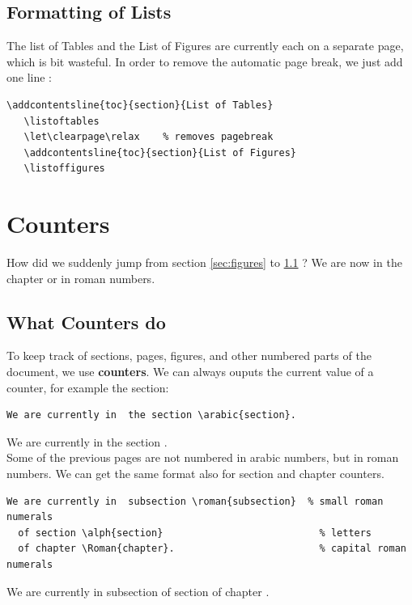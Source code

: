 \documentclass[a4paper,10pt]{report} %
\begin{document}
\subsection{Formatting of Lists}

The list of Tables and the List of Figures are currently each on a separate page, which is bit wasteful. In order to remove the automatic page break, we just add one line : 
\begin{lstlisting}[language={[latex]tex}, frame=single,basicstyle=\footnotesize]
   \addcontentsline{toc}{section}{List of Tables}
   \listoftables  
   \let\clearpage\relax    % removes pagebreak                       
   \addcontentsline{toc}{section}{List of Figures}  
   \listoffigures
\end{lstlisting}

 \setcounter{section}{1}
 \section{Counters}%
How did we suddenly jump from section \ref{sec:figures} to \ref{sec:counters}  ? We are now in the chapter  or  in roman numbers.\\

\subsection{What Counters do}\label{sec:counters}
To keep track of sections, pages, figures, and other numbered parts of the document, we use \textbf{counters}. We can always ouputs the current value of a counter, for example the section:
\begin{lstlisting}[language={[latex]tex}, frame=single,basicstyle=\footnotesize]
  We are currently in  the section \arabic{section}.
\end{lstlisting}

We are currently in  the section .\\

Some of the previous pages are not numbered in arabic numbers, but in roman numbers. We can get the same format also for section and chapter counters. 

\begin{lstlisting}[language={[latex]tex}, frame=single,basicstyle=\footnotesize]
  We are currently in  subsection \roman{subsection}  % small roman numerals 
  of section \alph{section}                           % letters
  of chapter \Roman{chapter}.                         % capital roman numerals
\end{lstlisting}
 We are currently in  subsection   %
  of section                            %
  of chapter .                         %
\end{document}
